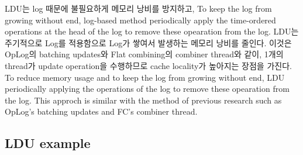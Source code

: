 \ifkor
LDU는 log 때문에 불필요하게 메모리 낭비를 방지하고, To keep the log from growing without end,
log-based method periodically apply the time-ordered operations at the head of
the log to remove these opearation from the log.
LDU는 주기적으로 Log를 적용함으로 Log가 쌓여서 발생하는 메모리 낭비를 줄인다. 
이것은 OpLog의 batching updates와 Flat combining의 combiner thread와 같이, 1개의
thread가 update operation을 수행하므로 cache locality가 높아지는 장점을 가진다. 
\else
To reduce memory usage and to keep the log from growing without end, LDU
periodically applying the operations  of the log to
remove these opearation from the log.
This approch is similar with the method of previous research such as OpLog's
batching updates and FC's combiner thread.

\fi




\subsection{LDU example}


